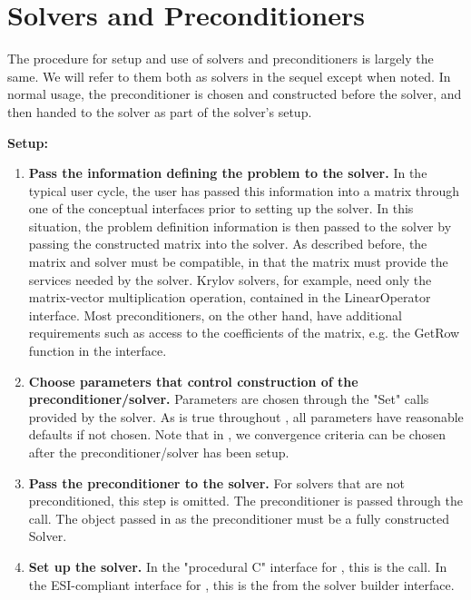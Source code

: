 \chapter{Solvers and Preconditioners}
\label{solvers}

The procedure for setup and use of solvers and preconditioners is largely
the same. We will refer to them both as solvers in the sequel except when noted. 
In normal usage, 
the preconditioner is chosen and constructed before the solver,
and then handed to the solver as part of the solver's setup.

{\bf Setup:}

\begin{enumerate}

\item
{\bf Pass the information defining the problem to the solver.} In the typical user cycle, the user
has passed this information into a matrix through one of the conceptual interfaces prior to
setting up the solver. In this situation, the problem definition information is then passed to
the solver by passing the constructed matrix into the solver. As described before, the matrix
and solver must be compatible, in that the matrix must provide the services needed by
the solver. Krylov solvers, for example, need only the matrix-vector multiplication operation,
contained in the LinearOperator interface. 
Most preconditioners, on the other hand, have additional requirements such as access to the
coefficients of the matrix, e.g. the GetRow function in the  interface.

\item
{\bf Choose parameters that control construction of the preconditioner/solver.} 
Parameters are chosen through the "Set" calls provided by the solver.
As is true throughout \hypre, all parameters have reasonable defaults if not chosen.
Note that in \hypre, we convergence criteria can be chosen after the preconditioner/solver
has been setup.

\item
{\bf Pass the preconditioner to the solver.} For solvers that are not preconditioned, this step
is omitted. The preconditioner is passed through the  call. The object passed
in as the preconditioner must be a fully constructed Solver.

\item
{\bf Set up the solver.} In the "procedural C" interface for \hypre, this is the  call.
In the ESI-compliant interface for \hypre, this is the  from the
solver builder interface.

\end{enumerate}

